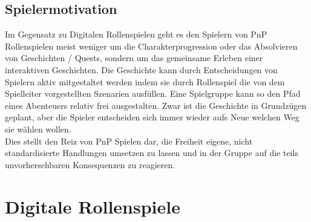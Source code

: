 \subsection{Spielermotivation}
\label{sec:Spielermotivation}

Im Gegensatz zu Digitalen Rollenspielen geht es den Spielern von PnP Rollenspielen meist weniger um die Charakterprogression oder das Absolvieren von Geschichten / Quests, sondern um das gemeinsame Erleben einer interaktiven Geschichten. Die Geschichte kann durch Entscheidungen von Spielern aktiv mitgestaltet werden indem sie durch Rollenspiel die von dem Spielleiter vorgestellten Szenarien ausfüllen. Eine Spielgruppe kann so den Pfad eines Abenteuers relativ frei ausgestalten. Zwar ist die Geschichte in Grundzügen geplant, aber die Spieler entscheiden sich immer wieder aufs Neue welchen Weg sie wählen wollen. \cite{Arinbjarnar}\\
Dies stellt den Reiz von PnP Spielen dar, die Freiheit eigene, nicht standardisierte Handlungen umsetzen zu lassen und in der Gruppe auf die teils unvorhersehbaren Konsequenzen zu reagieren.

\section{Digitale Rollenspiele}
\label{sec:DigitaleRollenspiele}
%

